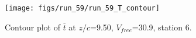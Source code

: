 \begin{figure}[H]
\centering
\texttt{[image: figs/run\_59/run\_59\_T\_contour]}
\caption{Contour plot of $\overline{t}$ at $z/c$=9.50, $V_{free}$=30.9, station 6.}
\end{figure}


